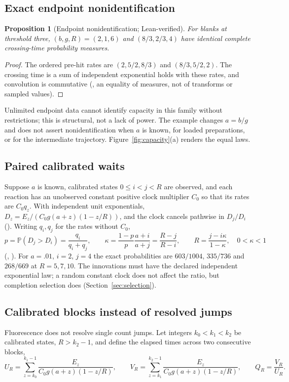 \documentclass[11pt,a4paper]{article}
\theoremstyle{plain}
\newtheorem{proposition}[theorem]{Proposition}
\theoremstyle{definition}
\theoremstyle{remark}
\newcommand{\Prob}{\mathbb P}
\begin{document}
\subsection{Exact endpoint nonidentification}
\begin{proposition}[Endpoint nonidentification; Lean-verified]\label{prop:nonident}
For blanks at threshold three, $(b,g,R)=(2,1,6)$ and $(8/3,2/3,4)$ have identical complete crossing-time probability measures.
\end{proposition}
\begin{proof}
The ordered pre-hit rates are $(2,5/2,8/3)$ and $(8/3,5/2,2)$. The crossing time is a sum of independent exponential holds with these rates, and convolution is commutative (, an equality of measures, not of transforms or sampled values).
\end{proof}
Unlimited endpoint data cannot identify capacity in this family without restrictions; this is structural, not a lack of power. The example changes $a=b/g$ and does not assert nonidentification when $a$ is known, for loaded preparations, or for the intermediate trajectory. Figure~\ref{fig:capacity}(a) renders the equal laws.

\subsection{Paired calibrated waits}
Suppose $a$ is known, calibrated states $0\le i<j<R$ are observed, and each reaction has an unobserved constant positive clock multiplier $C_0$ so that its rates are $C_0q_z$. With independent unit exponentials, $D_z=E_z/(C_0g(a+z)(1-z/R))$, and the clock cancels pathwise in $D_j/D_i$ (). Writing $q_i,q_j$ for the rates without $C_0$,
\begin{equation}\label{eq:paired}
p=\Prob(D_j>D_i)=\frac{q_i}{q_i+q_j},\qquad
\kappa=\frac{1-p}{p}\frac{a+i}{a+j}=\frac{R-j}{R-i},\qquad R=\frac{j-i\kappa}{1-\kappa},\quad0<\kappa<1
\end{equation}
(, ). For $a=.01$, $i=2$, $j=4$ the exact probabilities are $603/1004$, $335/736$ and $268/669$ at $R=5,7,10$. The innovations must have the declared independent exponential law; a random constant clock does not affect the ratio, but completion selection does (Section~\ref{sec:selection}).

\subsection{Calibrated blocks instead of resolved jumps}
Fluorescence does not resolve single count jumps. Let integers $k_0<k_1<k_2$ be calibrated states, $R>k_2-1$, and define the elapsed times across two consecutive blocks,
\begin{equation}\label{eq:blocks}
U_R=\sum_{z=k_0}^{k_1-1}\frac{E_z}{C_0g(a+z)(1-z/R)},\qquad V_R=\sum_{z=k_1}^{k_2-1}\frac{E_z}{C_0g(a+z)(1-z/R)},\qquad Q_R=\frac{V_R}{U_R}.
\end{equation}
\end{document}
